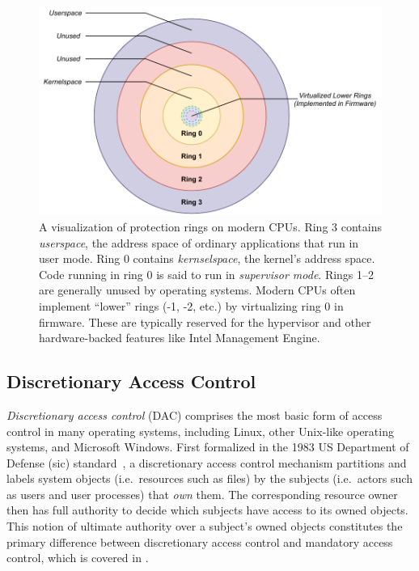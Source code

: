 \begin{figure}[tbp]
  \centering
  \includegraphics[width=0.8\linewidth]{figs/background/rings.pdf}
  \caption[Protection rings on modern CPUs]{
    A visualization of protection rings on modern CPUs. Ring 3 contains
    \textit{userspace}, the address space of ordinary applications that run in user mode.
    Ring 0 contains \textit{kernselspace}, the kernel's address space. Code running in
    ring 0 is said to run in \textit{supervisor mode}. Rings 1--2 are generally unused by
     operating systems.  Modern CPUs often implement \enquote{lower}
    rings (-1, -2, etc.) by virtualizing ring 0 in firmware. These are typically reserved
    for the hypervisor and other hardware-backed features like Intel Management Engine.
  }%
  \label{fig:rings}
\end{figure}

\subsection{Discretionary Access Control}%
\label{ss:dac}

\textit{Discretionary access control} (DAC) comprises the most basic form of access
control in many operating systems, including Linux, other Unix-like operating systems, and
Microsoft Windows. First formalized in the 1983 US Department of Defense (sic)
standard~\cite{orange_book}, a discretionary access control mechanism partitions and
labels system objects (i.e.~resources such as files) by the subjects (i.e.~actors such as
users and user processes) that \textit{own} them. The corresponding resource owner then
has full authority to decide which subjects have access to its owned objects. This notion
of ultimate authority over a subject's owned objects constitutes the primary difference
between discretionary access control and mandatory access control, which is covered in
.

